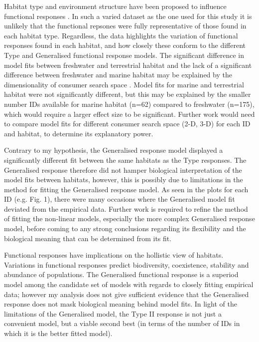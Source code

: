 \documentclass[11pt]{article}
\begin{document}
        Habitat type and environment structure have been proposed to influence functional responses \citep{hohberg2005predator}. In such a varied dataset as the one used for this study it is unlikely that the functional repsones were fully representative of those found in each habitat type. Regardless, the data highlights the variation of functional responses found in each habitat, and how closely these conform to the different Type and Generalised functional response models. The significant difference in model fits between freshwater and terrestrial habitat and the lack of a significant difference between freshwater and marine habitat may be explained by the dimensionality of consumer search space \citep{pawar2012dimensionality}. Model fits for marine and terrestrial habitat were not significantly different, but this may be explained by the smaller number IDs available for marine habitat (n=62) compared to freshwater (n=175), which would require a larger effect size to be significant. Further work would need to compare model fits for different consumer search space (2-D, 3-D) for each ID and habitat, to determine its explanatory power. 
            
        Contrary to my hypothesis, the Generalised response model displayed a significantly different fit between the same habitats as the Type responses. The Generalised response therefore did not hamper biological interpretation of the model fits between habitats, however, this is possibly due to limitations in the method for fitting the Generalised response model. As seen in the plots for each ID (e.g. Fig. 1), there were many occasions where the Generalised model fit deviated from the empirical data. Further work is required to refine the method of fitting the non-linear models, especially the more complex Generalised response model, before coming to any strong conclusions regarding its flexibility and the biological meaning that can be determined from its fit.
            
        Functional responses have implications on the hollistic view of habitats. Variations in functional responses predict biodiversity, coexistence, stability and abundance of populations. The Generalised functional response is a superiod model among the candidate set of models with regards to closely fitting empirical data; however my analysis does not give sufficient evidence that the Generalised response does not mask biological meaning behind model fits. In light of the limitations of the Generalised model, the Type II response is not just a convenient model, but a viable second best (in terms of the number of IDs in which it is the better fitted model).

    
    
        
\end{document}
